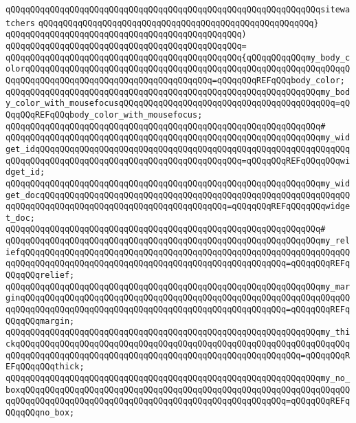 \verb|qQQqqQQqqQQqqQQqqQQqqQQqqQQqqQQqqQQqqQQqqQQqqQQqqQQqqQQqqQQqqQQqsitewatchers|\newline
\verb|qQQqqQQqqQQqqQQqqQQqqQQqqQQqqQQqqQQqqQQqqQQqqQQqqQQqqQQq}|\newline
\verb|qQQqqQQqqQQqqQQqqQQqqQQqqQQqqQQqqQQqqQQqqQQqqQQq)|\newline
\verb|qQQqqQQqqQQqqQQqqQQqqQQqqQQqqQQqqQQqqQQqqQQqqQQq=|\newline
\verb|qQQqqQQqqQQqqQQqqQQqqQQqqQQqqQQqqQQqqQQqqQQqqQQq{qQQqqQQqqQQqmy_body_colorqQQqqQQqqQQqqQQqqQQqqQQqqQQqqQQqqQQqqQQqqQQqqQQqqQQqqQQqqQQqqQQqqQQqqQQqqQQqqQQqqQQqqQQqqQQqqQQqqQQqqQQqqQQq=qQQqqQQqREFqQQqbody_color;|\newline
\verb|qQQqqQQqqQQqqQQqqQQqqQQqqQQqqQQqqQQqqQQqqQQqqQQqqQQqqQQqqQQqqQQqmy_body_color_with_mousefocusqQQqqQQqqQQqqQQqqQQqqQQqqQQqqQQqqQQqqQQqqQQq=qQQqqQQqREFqQQqbody_color_with_mousefocus;|\newline
\verb|qQQqqQQqqQQqqQQqqQQqqQQqqQQqqQQqqQQqqQQqqQQqqQQqqQQqqQQqqQQqqQQq#|\newline
\verb|qQQqqQQqqQQqqQQqqQQqqQQqqQQqqQQqqQQqqQQqqQQqqQQqqQQqqQQqqQQqqQQqmy_widget_idqQQqqQQqqQQqqQQqqQQqqQQqqQQqqQQqqQQqqQQqqQQqqQQqqQQqqQQqqQQqqQQqqQQqqQQqqQQqqQQqqQQqqQQqqQQqqQQqqQQqqQQqqQQqqQQq=qQQqqQQqREFqQQqqQQqwidget_id;|\newline
\verb|qQQqqQQqqQQqqQQqqQQqqQQqqQQqqQQqqQQqqQQqqQQqqQQqqQQqqQQqqQQqqQQqmy_widget_docqQQqqQQqqQQqqQQqqQQqqQQqqQQqqQQqqQQqqQQqqQQqqQQqqQQqqQQqqQQqqQQqqQQqqQQqqQQqqQQqqQQqqQQqqQQqqQQqqQQqqQQqqQQq=qQQqqQQqREFqQQqqQQqwidget_doc;|\newline
\verb|qQQqqQQqqQQqqQQqqQQqqQQqqQQqqQQqqQQqqQQqqQQqqQQqqQQqqQQqqQQqqQQq#|\newline
\verb|qQQqqQQqqQQqqQQqqQQqqQQqqQQqqQQqqQQqqQQqqQQqqQQqqQQqqQQqqQQqqQQqmy_reliefqQQqqQQqqQQqqQQqqQQqqQQqqQQqqQQqqQQqqQQqqQQqqQQqqQQqqQQqqQQqqQQqqQQqqQQqqQQqqQQqqQQqqQQqqQQqqQQqqQQqqQQqqQQqqQQqqQQqqQQqqQQq=qQQqqQQqREFqQQqqQQqrelief;|\newline
\verb|qQQqqQQqqQQqqQQqqQQqqQQqqQQqqQQqqQQqqQQqqQQqqQQqqQQqqQQqqQQqqQQqmy_marginqQQqqQQqqQQqqQQqqQQqqQQqqQQqqQQqqQQqqQQqqQQqqQQqqQQqqQQqqQQqqQQqqQQqqQQqqQQqqQQqqQQqqQQqqQQqqQQqqQQqqQQqqQQqqQQqqQQqqQQqqQQq=qQQqqQQqREFqQQqqQQqmargin;|\newline
\verb|qQQqqQQqqQQqqQQqqQQqqQQqqQQqqQQqqQQqqQQqqQQqqQQqqQQqqQQqqQQqqQQqmy_thickqQQqqQQqqQQqqQQqqQQqqQQqqQQqqQQqqQQqqQQqqQQqqQQqqQQqqQQqqQQqqQQqqQQqqQQqqQQqqQQqqQQqqQQqqQQqqQQqqQQqqQQqqQQqqQQqqQQqqQQqqQQqqQQq=qQQqqQQqREFqQQqqQQqthick;|\newline
\verb|qQQqqQQqqQQqqQQqqQQqqQQqqQQqqQQqqQQqqQQqqQQqqQQqqQQqqQQqqQQqqQQqmy_no_boxqQQqqQQqqQQqqQQqqQQqqQQqqQQqqQQqqQQqqQQqqQQqqQQqqQQqqQQqqQQqqQQqqQQqqQQqqQQqqQQqqQQqqQQqqQQqqQQqqQQqqQQqqQQqqQQqqQQqqQQqqQQq=qQQqqQQqREFqQQqqQQqno_box;|\newline
